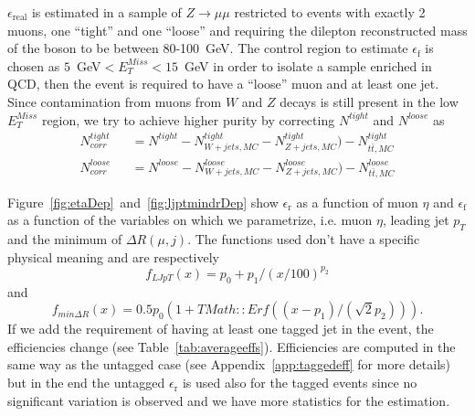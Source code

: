 $\epsilon_\mathrm{real}$ is estimated in a sample of $Z\rightarrow \mu\mu$ restricted to events with exactly 2 muons, one ``tight'' and one ``loose'' and requiring the dilepton reconstructed mass of the boson to be between 80-100~GeV. The control region to estimate $\epsilon_\mathrm{f}$ is chosen as $5$~GeV$< E^{Miss}_T<15$~GeV in order to isolate a sample enriched in QCD, then the event is required to have a ``loose'' muon and at least one jet. Since contamination from muons from $W$ and $Z$ decays is still present in the low $E^{Miss}_T$ region, we try to achieve higher purity by correcting $N^{tight}$ and $N^{loose}$ as 
\begin{eqnarray}
N^{tight}_{corr} &&=  N^{tight} - N^{tight}_{W+jets,MC} - N^{tight}_{Z+jets,MC}) - N^{tight}_{t\bar{t},MC}\\
N^{loose}_{corr} &&=  N^{loose} - N^{loose}_{W+jets,MC} - N^{loose}_{Z+jets,MC}) - N^{loose}_{t\bar{t},MC}
\end{eqnarray}

Figure~\ref{fig:etaDep}~and~\ref{fig:ljptmindrDep}  show $\epsilon_\mathrm{r}$ as a function of muon $\eta$ and  $\epsilon_\mathrm{f}$ as a function of the variables on which we parametrize, i.e. muon $\eta$, leading jet $p_T$ and the minimum of $\Delta R(\mu,j)$.  The functions used don't have a specific physical meaning and are respectively \begin{equation}\label{eq:paruntagljpt}
f_{LJpT}(x) = p_0 + p_1/(x/100)^{p_2}
\end{equation} and 
\begin{equation}\label{eq:parmindr}
f_{min\Delta R}(x) = 0.5 p_0 (1+TMath::Erf( (x-p_1)/(\sqrt{2}p_2))).
\end{equation} If we add the requirement of having at least one tagged jet in the event, the efficiencies change (see Table~\ref{tab:averageeffs}). Efficiencies are computed in the same way as the untagged case (see Appendix~\ref{app:taggedeff} for more details) but in the end the untagged $\epsilon_\mathrm{r}$ is used also for the tagged events since no significant variation is observed and we have more statistics for the estimation.

